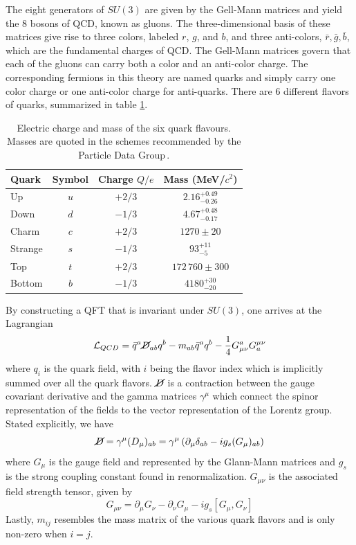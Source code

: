 The eight generators of $SU(3)$ are given by the Gell-Mann matrices and yield the 8 bosons of QCD, known as gluons. The three-dimensional basis of these matrices give rise to three colors, labeled $r$, $g$, and $b$, and three anti-colors, $\bar{r}, \bar{g}, \bar{b}$, which are the fundamental charges of QCD. The Gell-Mann matrices govern that each of the gluons can carry both a color and an anti-color charge. The corresponding fermions in this theory are named quarks and simply carry one color charge or one anti-color charge for anti-quarks. There are 6 different flavors of quarks, summarized in table \ref{tab:quark_masses}. 

\begin{table}[htbp]
    \centering
    \begin{tabular}{@{}lccc@{}}
      \toprule
      Quark & Symbol & Charge $Q/e$ & Mass (MeV/$c^{2}$) \\ 
      \midrule
      Up     & $u$ & $+2/3$ & $2.16^{+0.49}_{-0.26}$ \\
      Down   & $d$ & $-1/3$ & $4.67^{+0.48}_{-0.17}$ \\
      Charm  & $c$ & $+2/3$ & $1270 \pm 20$ \\
      Strange& $s$ & $-1/3$ & $93^{+11}_{-5}$ \\
      Top    & $t$ & $+2/3$ & $172\,760 \pm 300$ \\
      Bottom & $b$ & $-1/3$ & $4180^{+30}_{-20}$ \\
      \bottomrule
    \end{tabular}
    \caption{Electric charge and mass of the six quark flavours.
             Masses are quoted in the schemes recommended by the
             Particle Data Group\,\cite{ref:pdg2024}.}
    \label{tab:quark_masses}
  \end{table}


By constructing a QFT that is invariant under $SU(3)$, one arrives at the Lagrangian
\begin{equation}
    \mathcal{L}_{{QCD}} = \bar{q}^a\cancel{D}_{ab}q^b - m_{ab}\bar{q}^aq^b - \frac{1}{4}G^a_{\mu\nu}G_a^{\mu\nu}
\end{equation}
where $q_i$ is the quark field, with $i$ being the flavor index which is implicitly summed over all the quark flavors. $\cancel{D}$ is a contraction between the gauge covariant derivative and the gamma matrices $\gamma^\mu$ which connect the spinor representation of the fields to the vector representation of the Lorentz group. Stated explicitly, we have
\begin{equation}
    \cancel{D} = \gamma^\mu (D_\mu)_{ab} = \gamma^\mu\left( \partial_\mu \delta_{ab}  - ig_s(G_\mu)_{ab}\right)
\end{equation}
where $G_\mu$ is the gauge field and represented by the Glann-Mann matrices and $g_s$ is the strong coupling constant found in renormalization. $G_{\mu\nu}$ is the associated field strength tensor, given by
\begin{equation}
G_{\mu\nu} = \partial_\mu G_\nu - \partial_\nu G_\mu - ig_s[G_\mu, G_\nu]
\end{equation}
Lastly, $m_{ij}$ resembles the mass matrix of the various quark flavors and is only non-zero when $i=j$.

